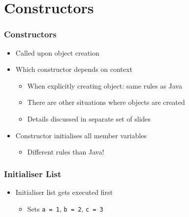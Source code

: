 \section{Constructors}
\frame{\tableofcontents[currentsection]}

\begin{frame}
  \frametitle{Constructors}
  \begin{itemize}
    \item Called upon object creation
    \item Which constructor depends on context
          \begin{itemize}
            \item When explicitly creating object: same rules as Java
            \item There are other situations where objects are created
            \item Details discussed in separate set of slides
          \end{itemize}
    \item Constructor initialises all member variables
          \begin{itemize}
            \item Different rules than Java!
          \end{itemize}
  \end{itemize}
\end{frame}

\begin{frame}
  \frametitle{Initialiser List}
  \begin{itemize}
    \item Initialiser list gets executed first
          \begin{itemize}
            \item Sets \texttt{a = 1}, \texttt{b = 2}, \texttt{c = 3}
          \end{itemize}
  \end{itemize}
\end{frame}

